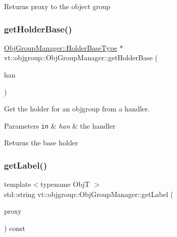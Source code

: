 \begin{DoxyReturn}{Returns}
proxy to the object group 
\end{DoxyReturn}
\mbox{\label{structvt_1_1objgroup_1_1_obj_group_manager_a5e471b3448e27e86697dcbb00e053230}} 
\subsubsection{\texorpdfstring{get\+Holder\+Base()}{getHolderBase()}}
{\footnotesize\ttfamily \hyperlink{structvt_1_1objgroup_1_1_obj_group_manager_a4898fc9cabf44890e5593f8c4ab86230}{Obj\+Group\+Manager\+::\+Holder\+Base\+Type} $\ast$ vt\+::objgroup\+::\+Obj\+Group\+Manager\+::get\+Holder\+Base (\begin{DoxyParamCaption}\item[{\hyperlink{namespacevt_af64846b57dfcaf104da3ef6967917573}{Handler\+Type}}]{han }\end{DoxyParamCaption})\hspace{0.3cm}{\ttfamily [private]}}



Get the holder for an objgroup from a handler. 


\begin{DoxyParams}[1]{Parameters}
\mbox{\tt in}  & {\em han} & the handler\\
\hline
\end{DoxyParams}
\begin{DoxyReturn}{Returns}
the base holder 
\end{DoxyReturn}
\mbox{\label{structvt_1_1objgroup_1_1_obj_group_manager_a9de1e58ebc9fd03769840cddb3bd54d7}} 
\subsubsection{\texorpdfstring{get\+Label()}{getLabel()}}
{\footnotesize\ttfamily template$<$typename ObjT $>$ \\
std\+::string vt\+::objgroup\+::\+Obj\+Group\+Manager\+::get\+Label (\begin{DoxyParamCaption}\item[{\hyperlink{structvt_1_1objgroup_1_1_obj_group_manager_aea65eef52f240a52210132eef5ce591f}{Obj\+Group\+Manager\+::\+Proxy\+Type}$<$ ObjT $>$}]{proxy }\end{DoxyParamCaption}) const}



